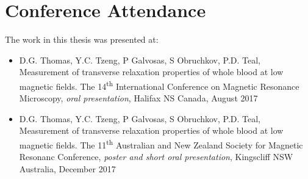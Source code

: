 \chapter*{Conference Attendance}
\label{ch:conference}
The work in this thesis was presented at:

\begin{itemize}
\item D.G. Thomas, Y.C. Tzeng, P Galvosas, S Obruchkov, P.D. Teal, Measurement of transverse relaxation properties of whole blood at low magnetic fields. The 14\textsuperscript{th} International Conference on Magnetic Resonance Microscopy, \textit{oral presentation}, Halifax NS Canada, August 2017
\item D.G. Thomas, Y.C. Tzeng, P Galvosas, S Obruchkov, P.D. Teal, Measurement of transverse relaxation properties of whole blood at low magnetic fields. The 11\textsuperscript{th} Australian and New Zealand Society for Magnetic Resonanc Conference, \textit{poster and short oral presentation}, Kingscliff NSW Australia, December 2017

\end{itemize}
